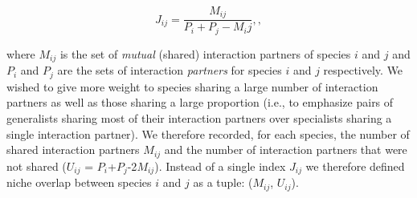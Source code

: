 \documentclass[12pt]{article}
\begin{document}
\begin{spacing}{1.5}
  \begin{equation}
    J_{ij} = \frac{M_{ij}}{P_i+P_j-M_ij} ,,
  \end{equation}

  where $M_{ij}$ is the set of \emph{mutual} (shared) interaction partners of 
  species $i$ and $j$ and $P_i$ and $P_j$ are the sets of interaction 
  \emph{partners} for species $i$ and $j$ respectively. We wished to give more 
  weight to species sharing a large number of interaction partners as well as 
  those sharing a large proportion (i.e., to emphasize pairs of generalists 
  sharing most of their interaction partners over specialists sharing a single 
  interaction partner). We therefore recorded, for each species, the number of 
  shared interaction partners $M_{ij}$ and the number of interaction partners 
  that were not shared ($U_{ij}$ = $P_{i}$+$P_{j}$-2$M_{ij}$). Instead of a 
  single index $J_{ij}$ we therefore defined niche overlap between species
  $i$ and $j$ as a tuple: ($M_{ij}$, $U_{ij}$).






\end{spacing}
\end{document}
